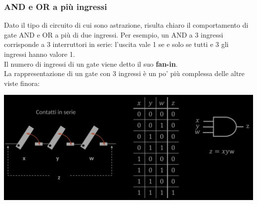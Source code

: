 \documentclass{article}
\begin{document}
\subsubsection{AND e OR a più ingressi}
Dato il tipo di circuito di cui sono astrazione, risulta chiaro il comportamento di gate AND e OR a più di due ingressi. Per esempio, un AND a 3 ingressi corrisponde a 3 interruttori in serie: l’uscita vale 1 se e solo se tutti e 3 gli ingressi hanno valore 1.\\
Il numero di ingressi di un gate viene detto il suo \textbf{fan-in}.
\vspace{0.2cm}\\
La rappresentazione di un gate con 3 ingressi è un po' più complessa delle altre viste finora:
\begin{center}
    \includegraphics[scale=0.35]{desGate3.png}
\end{center}
\end{document}
